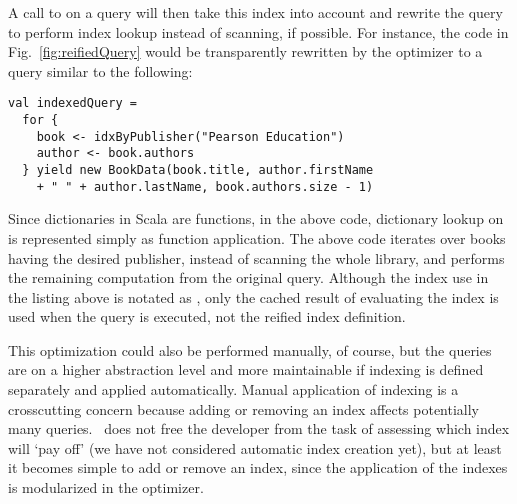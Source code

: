 
A call to  on a query will then take this index into account and rewrite the query to perform index lookup instead of scanning, if possible. For instance, the code in Fig.~\ref{fig:reifiedQuery} would be transparently rewritten by the optimizer to a query similar to the following:
\begin{lstlisting}
val indexedQuery =
  for {
    book <- idxByPublisher("Pearson Education")
    author <- book.authors
  } yield new BookData(book.title, author.firstName
    + " " + author.lastName, book.authors.size - 1)
\end{lstlisting}
Since dictionaries in Scala are functions, in the above code, dictionary lookup on  is represented simply as function application. The above code iterates over books having the desired publisher, instead of scanning the whole library, and performs the remaining computation from the original query. Although the index use in the listing above is notated as 
, only the cached result of evaluating the index is used when
the query is executed, not the reified index definition.

This optimization could also be performed manually, of course, but the queries are on a higher abstraction level and more maintainable if indexing is defined separately and applied automatically.
Manual application of indexing is a crosscutting concern because adding or removing an index affects potentially many queries.
\LoS\ does not free the developer from the task of assessing which index will `pay off' (we have not considered
automatic index creation yet), but at least it becomes simple to add or remove an index, since the application
of the indexes is modularized in the optimizer.



